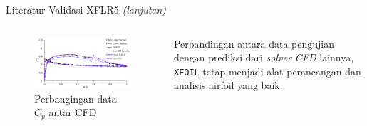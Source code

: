 \begin{frame}{Literatur Validasi XFLR5 \textit{(lanjutan)}}
  \begin{columns}[t]
    \begin{column}{.5\linewidth}
      \begin{figure}[h]
        \centering
        \includegraphics[width=0.8\linewidth]{statics/compar_airfoil3}
        \caption{Perbangingan data $C_p$ antar CFD}
        \label{fig:comparairfoil3}
      \end{figure}
    \end{column}

    \begin{column}{.5\linewidth}
      \begin{block}{}
        \cite{morgado2016xfoil} Perbandingan antara data pengujian dengan prediksi dari \textit{solver CFD} lainnya, \texttt{XFOIL} tetap menjadi alat perancangan dan analisis airfoil yang baik.
      \end{block}
    \end{column}
  \end{columns}
\end{frame}

